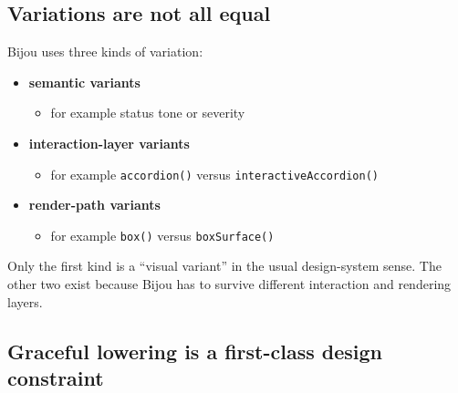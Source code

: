 \subsection{Variations are not all equal}\label{record-017-variations-are-not-all-equal}

Bijou uses three kinds of variation:

\begin{itemize}
\tightlist
\item
  \textbf{semantic variants}

  \begin{itemize}
  \tightlist
  \item
    for example status tone or severity
  \end{itemize}
\item
  \textbf{interaction-layer variants}

  \begin{itemize}
  \tightlist
  \item
    for example \texttt{a\allowbreak{}c\allowbreak{}c\allowbreak{}o\allowbreak{}r\allowbreak{}d\allowbreak{}i\allowbreak{}o\allowbreak{}n\allowbreak{}(\allowbreak{})} versus \texttt{i\allowbreak{}n\allowbreak{}t\allowbreak{}e\allowbreak{}r\allowbreak{}a\allowbreak{}c\allowbreak{}t\allowbreak{}i\allowbreak{}v\allowbreak{}e\allowbreak{}A\allowbreak{}c\allowbreak{}c\allowbreak{}o\allowbreak{}r\allowbreak{}d\allowbreak{}i\allowbreak{}o\allowbreak{}n\allowbreak{}(\allowbreak{})}
  \end{itemize}
\item
  \textbf{render-path variants}

  \begin{itemize}
  \tightlist
  \item
    for example \texttt{b\allowbreak{}o\allowbreak{}x\allowbreak{}(\allowbreak{})} versus \texttt{b\allowbreak{}o\allowbreak{}x\allowbreak{}S\allowbreak{}u\allowbreak{}r\allowbreak{}f\allowbreak{}a\allowbreak{}c\allowbreak{}e\allowbreak{}(\allowbreak{})}
  \end{itemize}
\end{itemize}

Only the first kind is a ``visual variant'' in the usual design-system sense. The other two exist because Bijou has to survive different interaction and rendering layers.

\subsection{Graceful lowering is a first-class design constraint}\label{record-017-graceful-lowering-is-a-first-class-design-constraint}

